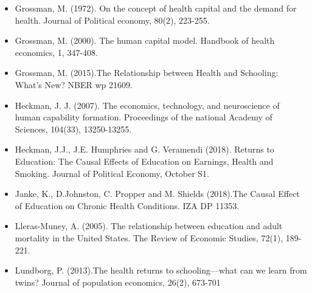 \begin{itemize}
        \item Grossman, M. (1972). On the concept of health capital and the demand for health. Journal of Political economy, 80(2), 223-255.
        \item Grossman, M. (2000). The human capital model. Handbook of health economics, 1, 347-408.
        \item Grossman, M. (2015).The Relationship between Health and Schooling: What’s New? NBER wp 21609.
        \item Heckman, J. J. (2007). The economics, technology, and neuroscience of human capability formation. Proceedings of the national
        Academy of Sciences, 104(33), 13250-13255.
        \item Heckman, J.J., J.E. Humphries and G. Veramendi (2018). Returns to Education: The Causal Effects of Education on Earnings, Health
        and Smoking. Journal of Political Economy, October S1.
        \item Janke, K., D.Johnston, C. Propper and M. Shields (2018).The Causal Effect of Education on Chronic Health Conditions. IZA DP 11353.
        \item Lleras-Muney, A. (2005). The relationship between education and adult mortality in the United States. The Review of Economic
        Studies, 72(1), 189-221.
        \item Lundborg, P. (2013).The health returns to schooling—what can we learn from twins? Journal of population economics, 26(2), 673-701 
    \end{itemize}